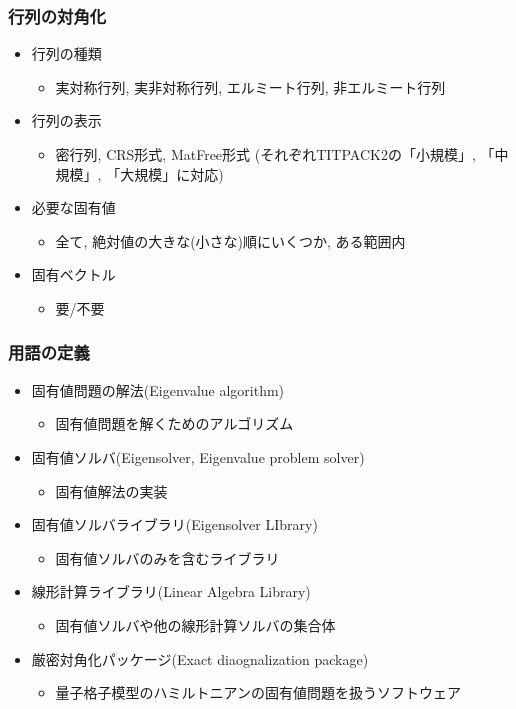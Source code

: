 \begin{frame}
  \frametitle{行列の対角化}
  \begin{itemize}
  \item 行列の種類
    \begin{itemize}
    \item 実対称行列, 実非対称行列, エルミート行列, 非エルミート行列
    \end{itemize}
  \item 行列の表示
    \begin{itemize}
      \item 密行列, CRS形式, MatFree形式 (それぞれTITPACK2の「小規模」, 
        「中規模」, 「大規模」に対応)
    \end{itemize}
  \item 必要な固有値
    \begin{itemize}
      \item 全て, 絶対値の大きな(小さな)順にいくつか, ある範囲内
    \end{itemize}
  \item 固有ベクトル
    \begin{itemize}
      \item 要/不要
    \end{itemize}
  \end{itemize}
\end{frame}

\begin{frame}
  \frametitle{用語の定義}
  \begin{itemize}
  \item 固有値問題の解法(Eigenvalue algorithm)
    \begin{itemize}
      \item 固有値問題を解くためのアルゴリズム
    \end{itemize}
  \item 固有値ソルバ(Eigensolver, Eigenvalue problem solver)
    \begin{itemize}
      \item 固有値解法の実装
    \end{itemize}
  \item 固有値ソルバライブラリ(Eigensolver LIbrary)
    \begin{itemize}
      \item 固有値ソルバのみを含むライブラリ
    \end{itemize}
  \item 線形計算ライブラリ(Linear Algebra Library)
    \begin{itemize}
      \item 固有値ソルバや他の線形計算ソルバの集合体
    \end{itemize}
  \item 厳密対角化パッケージ(Exact diaognalization package)
    \begin{itemize}
      \item 量子格子模型のハミルトニアンの固有値問題を扱うソフトウェア
    \end{itemize}
  \end{itemize}
\end{frame}

